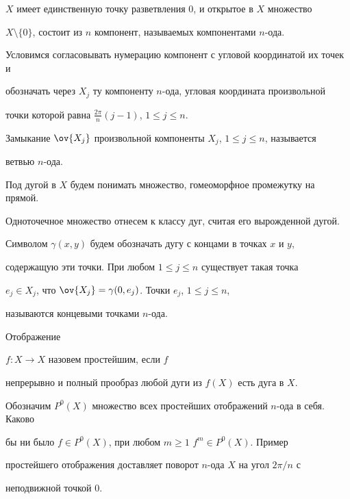 $X$ имеет единственную точку разветвления $0$, и открытое в $X$ множество


$X\setminus \{0\}$, состоит из $n$ компонент, называемых компонентами $n$-ода.


Условимся согласовывать нумерацию компонент с угловой координатой их точек и


обозначать через $X_j$ ту компоненту $n$-ода, угловая координата произвольной


точки которой равна $\frac{2\pi}{n}(j-1)$, $1\le j\le n$.





Замыкание $\ov{X_j}$ произвольной компоненты $X_j$, $1\le j\le n$, называется


ветвью $n$-ода.





Под дугой в $X$ будем понимать множество, гомеоморфное промежутку на прямой.


Одноточечное множество отнесем к классу дуг, считая его вырожденной дугой.


Символом $\gamma (x,y)$ будем обозначать дугу с концами в точках $x$ и $y$,


содержащую эти точки. При любом $1\le j\le n$ существует такая точка


$e_j\in X_j$, что $\ov{X_j}=\gamma (0,e_j)$. Точки $e_j$, $1\le j\le n$,


называются концевыми точками $n$-ода.





\begin{defn} Отображение


$f:X\to X$ назовем простейшим, если $f$


непрерывно и полный прообраз любой дуги из $f(X)$ есть дуга в $X$.


\end{defn}





Обозначим $P^0(X)$ множество всех простейших отображений $n$-ода в себя. Каково


бы ни было $f\in P^0(X)$, при любом $m\ge 1$ $f^m\in P^0(X)$. Пример


простейшего отображения доставляет поворот $n$-ода $X$ на угол $2\pi /n$ с


неподвижной точкой 0.





